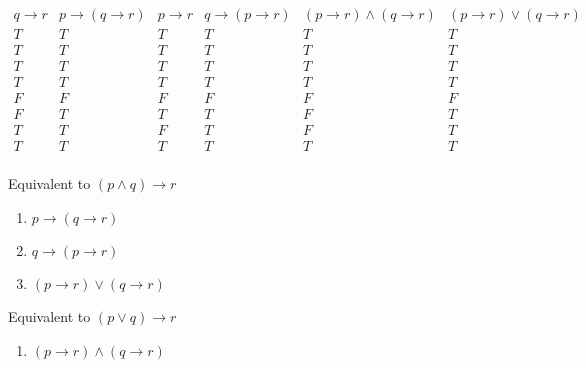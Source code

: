 \documentclass[12pt]{article}
\begin{document}
\begin{enumerate}
\begin{displaymath}
\begin{array}{|c|c|c|c|c|c|c|}
     q \rightarrow r &  p \rightarrow (q \rightarrow r) & p \rightarrow r & q \rightarrow (p \rightarrow r) & (p \rightarrow r) \wedge (q \rightarrow r) & (p \rightarrow r) \vee (q \rightarrow r) \\
\hline
T & T & T & T & T & T \\
T & T & T & T & T & T \\
T & T & T & T & T & T \\
T & T & T & T & T & T \\
F & F & F & F & F & F \\
F & T & T & T & F & T \\
T & T & F & T & F & T \\
T & T & T & T & T & T \\
\end{array}
\end{displaymath}

Equivalent to $(p \wedge q) \rightarrow r$
\begin{enumerate}
    \item $p \rightarrow (q \rightarrow r)$
    \item $q \rightarrow (p \rightarrow r) $
    \item $(p \rightarrow r) \vee (q \rightarrow r)$
\end{enumerate}


Equivalent to $(p \vee q) \rightarrow r$
\begin{enumerate}
    \item $(p \rightarrow r) \wedge (q \rightarrow r) $
\end{enumerate}

\end{enumerate}

\pagebreak
\end{document}
